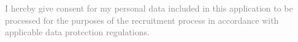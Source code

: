 \vfill
\begin{center}
    \begin{minipage}{0.9\textwidth}
        \footnotesize\textcolor{gray}{
            I hereby give consent for my personal data included in this application to be processed for the purposes of the recruitment process in accordance with applicable data protection regulations.
        }
    \end{minipage}
\end{center}
